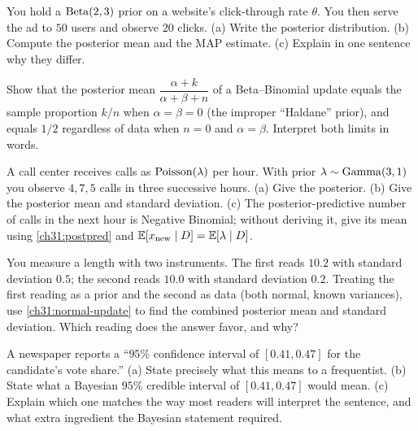 \begin{exercise}
You hold a $\operatorname{Beta}(2,3)$ prior on a website's click-through rate $\theta$. You then serve the
ad to $50$ users and observe $20$ clicks. (a) Write the posterior distribution. (b) Compute
the posterior mean and the MAP estimate. (c) Explain in one sentence why they differ.
\end{exercise}

\begin{exercise}
Show that the posterior mean $\dfrac{\alpha+k}{\alpha+\beta+n}$ of a Beta--Binomial update
equals the sample proportion $k/n$ when $\alpha=\beta=0$ (the improper ``Haldane'' prior),
and equals $1/2$ regardless of data when $n=0$ and $\alpha=\beta$. Interpret both limits in
words.
\end{exercise}

\begin{exercise}
A call center receives calls as $\operatorname{Poisson}(\lambda)$ per hour. With prior $\lambda\sim\operatorname{Gamma}(3,1)$
you observe $4, 7, 5$ calls in three successive hours. (a) Give the posterior. (b) Give the
posterior mean and standard deviation. (c) The posterior-predictive number of calls in the
next hour is Negative Binomial; without deriving it, give its mean using
\eqref{ch31:postpred} and $\operatorname{\mathbb{E}}[x_{\text{new}}\mid D]=\operatorname{\mathbb{E}}[\lambda\mid D]$.
\end{exercise}

\begin{exercise}
You measure a length with two instruments. The first reads $10.2$ with standard deviation
$0.5$; the second reads $10.0$ with standard deviation $0.2$. Treating the first reading as
a prior and the second as data (both normal, known variances), use
\eqref{ch31:normal-update} to find the combined posterior mean and standard deviation.
Which reading does the answer favor, and why?
\end{exercise}

\begin{exercise}
A newspaper reports a ``$95\%$ confidence interval of $[0.41, 0.47]$ for the candidate's
vote share.'' (a) State precisely what this means to a frequentist. (b) State what a
Bayesian $95\%$ credible interval of $[0.41,0.47]$ would mean. (c) Explain which one
matches the way most readers will interpret the sentence, and what extra ingredient the
Bayesian statement required.
\end{exercise}


